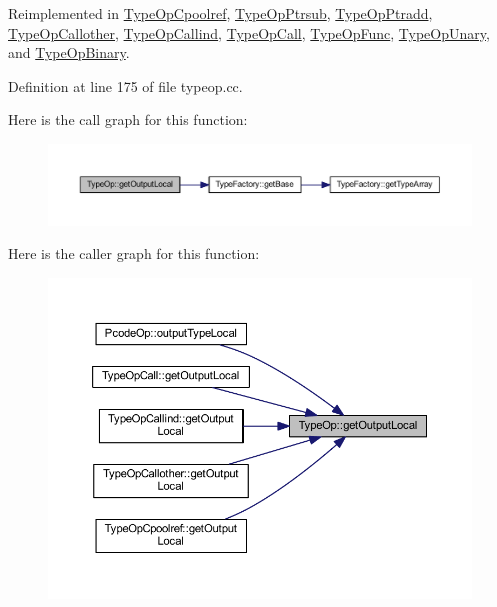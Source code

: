 Reimplemented in \mbox{\hyperlink{class_type_op_cpoolref_af6f8c8b7ce807d7773e55820c11a08f1}{Type\+Op\+Cpoolref}}, \mbox{\hyperlink{class_type_op_ptrsub_ada6371e868ebf8d0f5aae1ba70a60e36}{Type\+Op\+Ptrsub}}, \mbox{\hyperlink{class_type_op_ptradd_af8fe09a62086231038f5c181dc0d0a03}{Type\+Op\+Ptradd}}, \mbox{\hyperlink{class_type_op_callother_a7040d3f5ac8b93796627304da778250f}{Type\+Op\+Callother}}, \mbox{\hyperlink{class_type_op_callind_a41272ab087f4aacf6c3434911bbc055e}{Type\+Op\+Callind}}, \mbox{\hyperlink{class_type_op_call_a0900277daf94a76b57d96ba468514815}{Type\+Op\+Call}}, \mbox{\hyperlink{class_type_op_func_a279fd2e0aaf14e6a15bb12548cd3cc69}{Type\+Op\+Func}}, \mbox{\hyperlink{class_type_op_unary_a33872e1381109a5fdb1030a2771e0c6e}{Type\+Op\+Unary}}, and \mbox{\hyperlink{class_type_op_binary_a183a65ebb3716a380229e38c3383fd98}{Type\+Op\+Binary}}.



Definition at line 175 of file typeop.\+cc.

Here is the call graph for this function\+:
\nopagebreak
\begin{figure}[H]
\begin{center}
\leavevmode
\includegraphics[width=350pt]{class_type_op_a3454cadfb15f6794829123a7ecfe38f5_cgraph}
\end{center}
\end{figure}
Here is the caller graph for this function\+:
\nopagebreak
\begin{figure}[H]
\begin{center}
\leavevmode
\includegraphics[width=350pt]{class_type_op_a3454cadfb15f6794829123a7ecfe38f5_icgraph}
\end{center}
\end{figure}
\mbox{\label{class_type_op_a7150ac93bb03a993735c829deb5237e7}} 
